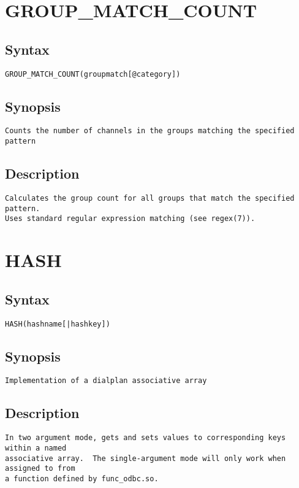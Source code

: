 \section{GROUP\_MATCH\_COUNT}
\subsection{Syntax}
\begin{verbatim}
GROUP_MATCH_COUNT(groupmatch[@category])
\end{verbatim}
\subsection{Synopsis}
\begin{verbatim}
Counts the number of channels in the groups matching the specified pattern
\end{verbatim}
\subsection{Description}
\begin{verbatim}
Calculates the group count for all groups that match the specified pattern.
Uses standard regular expression matching (see regex(7)).

\end{verbatim}


\section{HASH}
\subsection{Syntax}
\begin{verbatim}
HASH(hashname[|hashkey])
\end{verbatim}
\subsection{Synopsis}
\begin{verbatim}
Implementation of a dialplan associative array
\end{verbatim}
\subsection{Description}
\begin{verbatim}
In two argument mode, gets and sets values to corresponding keys within a named
associative array.  The single-argument mode will only work when assigned to from
a function defined by func_odbc.so.

\end{verbatim}



